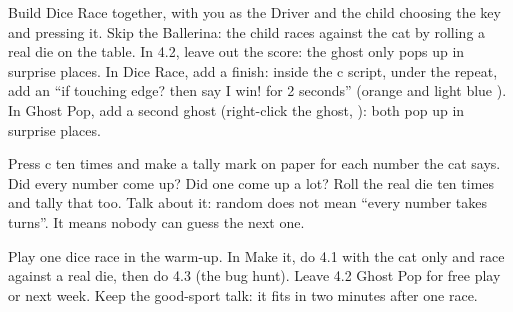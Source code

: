 \begin{differentiation}
\supportpath Build Dice Race together, with you as the Driver and the child choosing the key and pressing it. Skip the Ballerina: the child races against the cat by rolling a real die on the table. In 4.2, leave out the score: the ghost only pops up in surprise places.
\extensionpath In Dice Race, add a finish: inside the c script, under the repeat, add an \enquote{if touching edge? then say I win! for 2 seconds} (orange  and light blue ). In Ghost Pop, add a second ghost (right-click the ghost, ): both pop up in surprise places.
\end{differentiation}

\begin{stretchchallenge}
Press c ten times and make a tally mark on paper for each number the cat says. Did every number come up? Did one come up a lot? Roll the real die ten times and tally that too. Talk about it: random does not mean \enquote{every number takes turns}. It means nobody can guess the next one.
\end{stretchchallenge}

\begin{teachernote}
Play one dice race in the warm-up. In Make it, do 4.1 with the cat only and race against a real die, then do 4.3 (the bug hunt). Leave 4.2 Ghost Pop for free play or next week. Keep the good-sport talk: it fits in two minutes after one race.
\end{teachernote}
